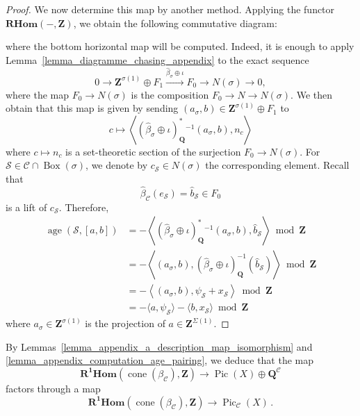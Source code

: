 \documentclass{proc-l}
\newcommand{\Z}{\mathbf{Z}}
\newcommand{\Q}{\mathbf{Q}}
\DeclareMathOperator{\Pic}{Pic}
\DeclareMathOperator{\Ext}{Ext}
\DeclareMathOperator{\coneform}{cone}
\DeclareMathOperator{\age}{age}
\DeclareMathOperator{\Boxe}{Box}
\newcommand{\stackS}{\mathcal{S}}
\theoremstyle{definition}
\theoremstyle{remark}
\numberwithin{equation}{section}
\begin{document}
\begin{proof}
We now determine this map by another method. Applying the functor $\mathbf{RHom}(-,\Z)$, we obtain the following commutative diagram:
\begin{center}
\end{center}
where the bottom horizontal map will be computed. Indeed, it is enough to apply Lemma~\ref{lemma_diagramme_chasing_appendix} to the exact sequence
\[
0 \rightarrow \Z^{\sigma(1)} \oplus F_1 \xrightarrow{\widehat{\beta}_{\sigma} \oplus \iota} F_0 \rightarrow N(\sigma) \rightarrow 0,
\]
where the map $F_0 \rightarrow N(\sigma)$ is the composition $F_0 \rightarrow N \rightarrow N(\sigma)$. We then obtain that this map is given by sending $(a_{\sigma},b) \in \Z^{\sigma(1)} \oplus F_1$ to
\[
c \mapsto \left\langle (\widehat{\beta}_{\sigma} \oplus \iota)^*_{\Q}{}^{-1}(a_{\sigma},b), n_c \right\rangle
\]where $c \mapsto n_c$ is a set-theoretic section of the surjection $F_0 \rightarrow N(\sigma)$. For $\stackS \in \mathcal{C} \cap \Boxe(\sigma)$, we denote by $c_{\stackS} \in N(\sigma)$ the corresponding element. Recall that
\[
\widehat{\beta}_{\mathcal{C}}(e_{\stackS}) = \widehat{b}_{\stackS} \in F_0
\]
is a lift of $c_{\stackS}$. Therefore,
\begin{align*}
    \age(\stackS,[a,b]) &= - \left\langle (\widehat{\beta}_{\sigma} \oplus \iota)^*_{\Q}{}^{-1}(a_{\sigma},b), \widehat{b}_{\stackS} \right\rangle \bmod{\Z} \\
    &= - \left\langle (a_{\sigma},b), (\widehat{\beta}_{\sigma} \oplus \iota)_{\Q}^{-1}(\widehat{b}_{\stackS}) \right\rangle \bmod{\Z} \\
    &= - \left\langle (a_{\sigma},b), \psi_{\stackS} + x_{\stackS} \right\rangle \bmod{\Z} \\
    &= - \langle a , \psi_{\stackS} \rangle - \langle b , x_{\stackS} \rangle \bmod{\Z}
\end{align*}where $a_{\sigma} \in \Z^{\sigma(1)}$ is the projection of $a \in \Z^{\Sigma(1)}$.

\end{proof}

By Lemmas~\ref{lemma_appendix_a_description_map_isomorphism} and \ref{lemma_appendix_computation_age_pairing}, we deduce that the map
\[
\mathbf{R^1 Hom}(\coneform(\beta_{\mathcal{C}}),\Z) \longrightarrow \Pic(X) \oplus \Q^{\mathcal{C}}
\]
factors through a map
\begin{equation}\label{equation_appendix_identification_extended_picard_group}
\mathbf{R^1 Hom}(\coneform(\beta_{\mathcal{C}}),\Z) \longrightarrow \Pic_{\mathcal{C}}(X) \, .    
\end{equation}
\end{document}
